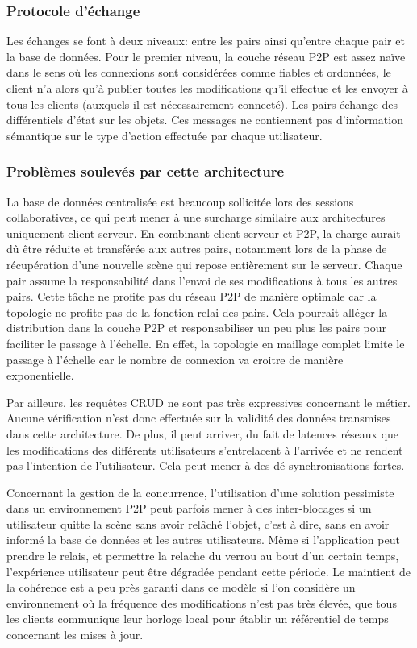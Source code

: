 \subsubsection{Protocole d'échange}
Les échanges se font à deux niveaux: entre les pairs ainsi qu'entre chaque pair et 
la base de données. Pour le premier niveau, la couche réseau \gls{P2P} est assez 
naïve dans le sens où les connexions sont considérées comme fiables et 
ordonnées, le client n'a alors qu'à publier toutes les modifications qu'il effectue et 
les envoyer à tous les clients (auxquels il est nécessairement connecté).
Les pairs échange des différentiels d'état sur les objets. Ces messages ne 
contiennent pas d'information sémantique sur le type d'action effectuée par chaque 
utilisateur. 
\subsubsection{Problèmes soulevés par cette architecture}

La base de données centralisée est beaucoup sollicitée lors des sessions 
collaboratives, ce qui peut mener à une surcharge similaire aux architectures 
uniquement client serveur. 
En combinant client-serveur et \gls{P2P}, la charge aurait dû être réduite et 
transférée aux autres pairs, notamment lors de la phase de récupération d'une 
nouvelle scène qui repose entièrement sur le serveur. 
Chaque pair assume la responsabilité dans l'envoi de ses modifications à tous les 
autres pairs. Cette tâche ne profite pas du réseau \gls{P2P} de manière optimale 
car la topologie ne profite pas de la fonction relai des pairs. Cela pourrait alléger  la 
distribution dans la couche \gls{P2P} et responsabiliser un peu plus les pairs pour 
faciliter le passage à l'échelle.
En effet, la topologie en maillage complet limite le passage à l'échelle car le 
nombre de connexion va croitre de manière exponentielle. 

Par ailleurs, les requêtes \gls{CRUD} ne sont pas très expressives concernant le 
métier. 
Aucune vérification n'est donc effectuée sur la validité des données transmises 
dans cette architecture. De plus, il peut arriver, du fait de latences réseaux que les 
modifications des différents utilisateurs s'entrelacent à l'arrivée et ne rendent pas 
l'intention de l'utilisateur. Cela peut mener à des dé-synchronisations fortes.

Concernant la gestion de la concurrence, l'utilisation d'une solution pessimiste 
dans un environnement \gls{P2P} peut parfois mener à des inter-blocages si un 
utilisateur quitte la scène sans avoir relâché l'objet, c'est à dire, sans en avoir 
informé la base de données et les autres 
utilisateurs. 
Même si l'application peut prendre le relais, et permettre la relache du 
verrou au bout d'un certain temps, l'expérience utilisateur peut être dégradée 
pendant cette période.
Le maintient de la cohérence est a peu près garanti dans ce modèle si l'on 
considère un environnement où la fréquence des modifications n'est pas très 
élevée, que tous les clients communique leur horloge local pour établir un 
référentiel de temps concernant les mises à jour. 

